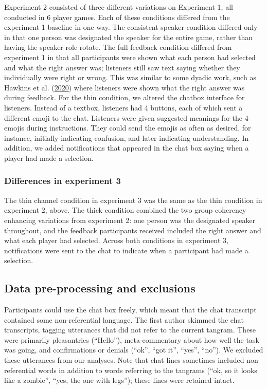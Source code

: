 \documentclass[
  english,
  a4paper,
]{article}
\begin{document}
Experiment 2 consisted of three different variations on Experiment 1, all conducted in 6 player games. Each of these conditions differed from the experiment 1 baseline in one way. The consistent speaker condition differed only in that one person was designated the speaker for the entire game, rather than having the speaker role rotate. The full feedback condition differed from experiment 1 in that all participants were shown what each person had selected and what the right answer was; listeners still saw text saying whether they individually were right or wrong. This was similar to some dyadic work, such as Hawkins et al. (\protect\hyperlink{ref-hawkins2020}{2020}) where listeners were shown what the right answer was during feedback. For the thin condition, we altered the chatbox interface for listeners. Instead of a textbox, listeners had 4 buttons, each of which sent a different emoji to the chat. Listeners were given suggested meanings for the 4 emojis during instructions. They could send the emojis as often as desired, for instance, initially indicating confusion, and later indicating understanding. In addition, we added notifications that appeared in the chat box saying when a player had made a selection.

\hypertarget{differences-in-experiment-3}{%
\subsubsection{Differences in experiment 3}\label{differences-in-experiment-3}}

The thin channel condition in experiment 3 was the same as the thin condition in experiment 2, above. The thick condition combined the two group coherency enhancing variations from experiment 2: one person was the designated speaker throughout, and the feedback participants received included the right answer and what each player had selected. Across both conditions in experiment 3, notifications were sent to the chat to indicate when a participant had made a selection.

\hypertarget{data-pre-processing-and-exclusions}{%
\subsection{Data pre-processing and exclusions}\label{data-pre-processing-and-exclusions}}

Participants could use the chat box freely, which meant that the chat transcript contained some non-referential language. The first author skimmed the chat transcripts, tagging utterances that did not refer to the current tangram. These were primarily pleasantries (``Hello''), meta-commentary about how well the task was going, and confirmations or denials (``ok'', ``got it'', ``yes'', ``no''). We excluded these utterances from our analyses. Note that chat lines sometimes included non-referential words in addition to words referring to the tangrams (``ok, so it looks like a zombie'', ``yes, the one with legs''); these lines were retained intact.
\end{document}
